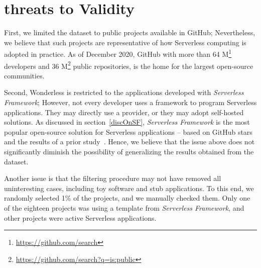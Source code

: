 \section{threats to Validity}
\label{limitations}

%

First, we limited the dataset to public projects available in GitHub; 
Nevertheless, we believe that such projects are representative of 
how Serverless computing is adopted in practice.
As of December 2020, 
GitHub with more than 64 M\footnote{\url{https://github.com/search}} 
developers and 36 M\footnote{\url{https://github.com/search?q=is:public}} public 
repositories, is the home for the largest open-source communities. 
%

Second, Wonderless is restricted to the applications 
developed with \emph{Serverless Framework}; 
However, not every developer uses a framework to program Serverless applications. 
They may directly use a provider, or they may adopt self-hosted solutions. 
%
As discussed in section~\ref{discOnSF}, \emph{Serverless Framework} is the 
most popular open-source solution for Serverless applications -- 
based on GitHub stars and the results of a prior study~\cite{kritikos2018review}. 
Hence, we believe that the issue above does not significantly diminish 
the possibility of generalizing the results obtained from the dataset.

Another issue is that the filtering procedure may not have removed all 
uninteresting cases, including toy software and stub applications.
To this end, we randomly selected 1\% of the projects, 
and we manually checked them. 
Only one of the eighteen projects was using a template from \emph{Serverless Framework}, 
and other projects were active Serverless applications.








